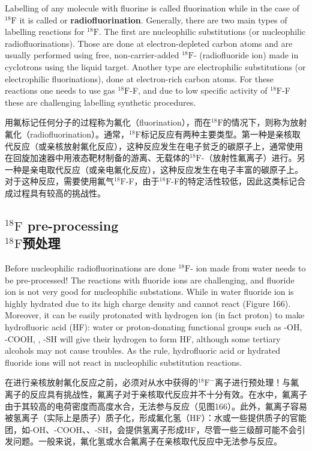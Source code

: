 \documentclass[dvipsnames, svgnames,a4paper,11pt]{article}
\begin{document}
Labelling of any molecule with fluorine is called fluorination while in the case of ${}^\mathrm{18}\mathrm{F}$ it
is called or \textbf{radiofluorination}. Generally, there are two main types of labelling
reactions for ${}^\mathrm{18}\mathrm{F}$. The first are nucleophilic substitutions (or nucleophilic
radiofluorinations). Those are done at electron-depleted carbon atoms and are
usually performed using free, non-carrier-added ${}^\mathrm{18}\mathrm{F}$- (radiofluoride ion) made in
cyclotrons using the liquid target. Another type are electrophilic substitutions (or
electrophilic fluorinations), done at electron-rich carbon atoms. For these reactions
one needs to use gas ${}^\mathrm{18}\mathrm{F}$-F, and due to low specific activity of ${}^\mathrm{18}\mathrm{F}$-F these are
challenging labelling synthetic procedures.

用氟标记任何分子的过程称为氟化（fluorination），而在${}^\mathrm{18}\mathrm{F}$的情况下，则称为放射氟化（radiofluorination）。通常，${}^\mathrm{18}\mathrm{F}$标记反应有两种主要类型。第一种是亲核取代反应（或亲核放射氟化反应），这种反应发生在电子贫乏的碳原子上，通常使用在回旋加速器中用液态靶材制备的游离、无载体的${}^\mathrm{18}\mathrm{F}$-（放射性氟离子）进行。另一种是亲电取代反应（或亲电氟化反应），这种反应发生在电子丰富的碳原子上。对于这种反应，需要使用氟气${}^\mathrm{18}\mathrm{F}$-F，由于${}^\mathrm{18}\mathrm{F}$-F的特定活性较低，因此这类标记合成过程具有较高的挑战性。


\subsection{${}^\mathrm{18}\mathrm{F}$ pre-processing \\${}^\mathrm{18}\mathrm{F}$预处理}
Before nucleophilic radiofluorinations are done ${}^\mathrm{18}\mathrm{F}$- ion made from water needs to be
pre-processed! The reactions with fluoride ions are challenging, and fluoride ion is
not very good for nucleophilic substations. While in water fluoride ion is highly
hydrated due to its high charge density and cannot react (Figure 166). Moreover, it
can be easily protonated with hydrogen ion (in fact proton) to make hydrofluoric acid
(HF): water or proton-donating functional groups such as -OH, -COOH, , -SH
will give their hydrogen to form HF, although some tertiary alcohols may not cause
troubles. As the rule, hydrofluoric acid or hydrated fluoride ions will not react in
nucleophilic substitution reactions.

在进行亲核放射氟化反应之前，必须对从水中获得的${}^\mathrm{18}\mathrm{F}^-$离子进行预处理！与氟离子的反应具有挑战性，氟离子对于亲核取代反应并不十分有效。在水中，氟离子由于其较高的电荷密度而高度水合，无法参与反应（见图166）。此外，氟离子容易被氢离子（实际上是质子）质子化，形成氟化氢（HF）：水或一些提供质子的官能团，如-OH、-COOH、、-SH，会提供氢离子形成HF，尽管一些三级醇可能不会引发问题。一般来说，氟化氢或水合氟离子在亲核取代反应中无法参与反应。
\end{document}
